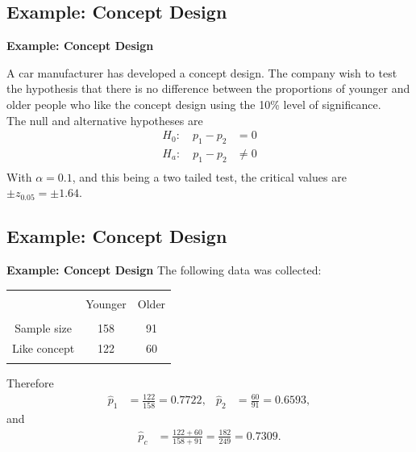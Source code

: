 \documentclass[compress]{beamer}        %
\makeatletter
\newcommand{\tcb}{\textcolor{beamer@blendedblue}}
\makeatother
\begin{document}
\subsection{Example: Concept Design}
\begin{frame}{\bf \tcb{Example: Concept Design}}

A car manufacturer has developed a concept design. The company wish to test the hypothesis that there is no difference between the proportions of younger and older people who like the concept design using the 10\% level of significance.\\[0.8cm]

The null and alternative hypotheses are
\begin{align*}
H_0:\quad p_1 - p_2 &= 0\\[0.2cm]
H_a:\quad p_1 - p_2 &\ne 0\\[-0.3cm]
\end{align*}
With $\alpha=0.1$, and this being a two tailed test, the critical values are $\pm z_{0.05} = \pm 1.64$.

\end{frame}


\subsection{Example: Concept Design}
\begin{frame}{\bf \tcb{Example: Concept Design}}
The following data was collected:
\begin{center}
\begin{tabular}{|c|c|c|}
\hline
&&\\[-0.3cm]
& Younger & Older \\
\hline
&&\\[-0.2cm]
Sample size      & 158 & 91 \\[0.2cm]
Like concept   &  122  & 60 \\[0.2cm]
\hline
\multicolumn{2}{c}{}
\end{tabular}
\end{center}
Therefore
\begin{align*}
\hat p_1 &= \frac{122}{158} = 0.7722, & \hat p_2 &= \frac{60}{91} = 0.6593,
\end{align*}
and
\begin{align*}
\hat p_c &= \frac{122+60}{158+91} = \frac{182}{249} = 0.7309.
\end{align*}

\end{frame}
\end{document}
